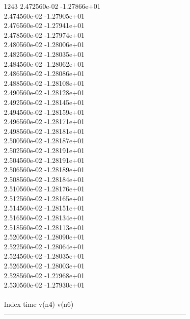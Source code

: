 1243	2.472560e-02	-1.27866e+01	\\ 	2.474560e-02	-1.27905e+01	\\ 	2.476560e-02	-1.27941e+01	\\ 	2.478560e-02	-1.27974e+01	\\ 	2.480560e-02	-1.28006e+01	\\ 	2.482560e-02	-1.28035e+01	\\ 	2.484560e-02	-1.28062e+01	\\ 	2.486560e-02	-1.28086e+01	\\ 	2.488560e-02	-1.28108e+01	\\ 	2.490560e-02	-1.28128e+01	\\ 	2.492560e-02	-1.28145e+01	\\ 	2.494560e-02	-1.28159e+01	\\ 	2.496560e-02	-1.28171e+01	\\ 	2.498560e-02	-1.28181e+01	\\ 	2.500560e-02	-1.28187e+01	\\ 	2.502560e-02	-1.28191e+01	\\ 	2.504560e-02	-1.28191e+01	\\ 	2.506560e-02	-1.28189e+01	\\ 	2.508560e-02	-1.28184e+01	\\ 	2.510560e-02	-1.28176e+01	\\ 	2.512560e-02	-1.28165e+01	\\ 	2.514560e-02	-1.28151e+01	\\ 	2.516560e-02	-1.28134e+01	\\ 	2.518560e-02	-1.28113e+01	\\ 	2.520560e-02	-1.28090e+01	\\ 	2.522560e-02	-1.28064e+01	\\ 	2.524560e-02	-1.28035e+01	\\ 	2.526560e-02	-1.28003e+01	\\ 	2.528560e-02	-1.27968e+01	\\ 	2.530560e-02	-1.27930e+01	\\ \hline
\\ \hline
Index   time            v(n4)-v(n6)     \\ \hline
--------------------------------------------------------------------------------\\ \hline
